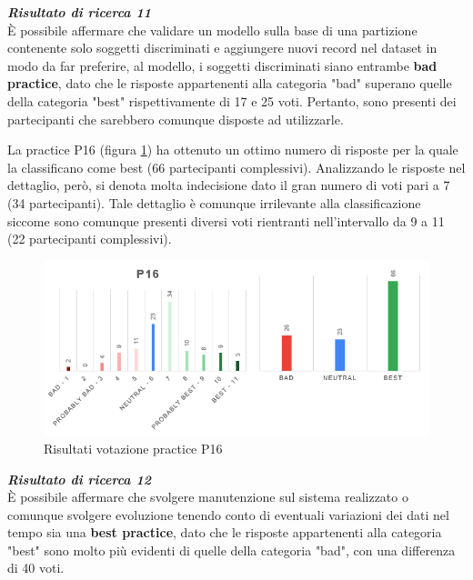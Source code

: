 \begin{center}
    \begin{tcolorbox}[width=400pt, colframe=black, colback=Gray!30]
		\begin{minipage}{\textwidth}
			\textit{\faKey \textbf{ Risultato di ricerca 11}}\\
			È possibile affermare che validare un modello sulla base di una partizione contenente solo soggetti discriminati e aggiungere nuovi record nel dataset in modo da far preferire, al modello, i soggetti discriminati siano entrambe \textbf{bad practice}, dato che le risposte appartenenti alla categoria "bad" superano quelle della categoria "best" rispettivamente di 17 e 25 voti. Pertanto, sono presenti dei partecipanti che sarebbero comunque disposte ad utilizzarle.
		\end{minipage}
	\end{tcolorbox}
\end{center}

La practice P16 (figura \ref{im-a-prac-17}) ha ottenuto un ottimo numero di risposte per la quale la classificano come best (66 partecipanti complessivi). Analizzando le risposte nel dettaglio, però, si denota molta indecisione dato il gran numero di voti pari a 7 (34 partecipanti). Tale dettaglio è comunque irrilevante alla classificazione siccome sono comunque presenti diversi voti rientranti nell'intervallo da 9 a 11 (22 partecipanti complessivi).

\begin{figure}[h!]
    \centering
    \includegraphics[width=1\textwidth]{figure/data-analysis3/P16.png}
    \caption{Risultati votazione practice P16}
    \label{im-a-prac-17}
\end{figure}

\begin{center}
    \begin{tcolorbox}[width=400pt, colframe=black, colback=Gray!30]
		\begin{minipage}{\textwidth}
			\textit{\faKey \textbf{ Risultato di ricerca 12}}\\
			È possibile affermare che svolgere manutenzione sul sistema realizzato o comunque svolgere evoluzione tenendo conto di eventuali variazioni dei dati nel tempo sia una \textbf{best practice}, dato che le risposte appartenenti alla categoria "best" sono molto più evidenti di quelle della categoria "bad", con una differenza di 40 voti.
		\end{minipage}
	\end{tcolorbox}
\end{center}

